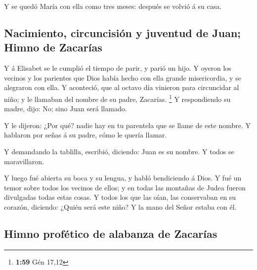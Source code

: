  Y se quedó María con ella como tres meses: después se
volvió á su casa.

\hypertarget{nacimiento-circuncisiuxf3n-y-juventud-de-juan-himno-de-zacaruxedas}{%
\subsection{Nacimiento, circuncisión y juventud de Juan; Himno de
Zacarías}\label{nacimiento-circuncisiuxf3n-y-juventud-de-juan-himno-de-zacaruxedas}}

 Y á Elisabet se le cumplió el tiempo de parir, y parió un
hijo.  Y oyeron los vecinos y los parientes que Dios había
hecho con ella grande misericordia, y se alegraron con ella.
 Y aconteció, que al octavo día vinieron para circuncidar
al niño; y le llamaban del nombre de su padre, Zacarías. \footnote{\textbf{1:59}
  Gén 17,12}  Y respondiendo su madre, dijo: No; sino Juan
será llamado.

 Y le dijeron: ¿Por qué? nadie hay en tu parentela que se
llame de este nombre.  Y hablaron por señas á su padre,
cómo le quería llamar.

 Y demandando la tablilla, escribió, diciendo: Juan es su
nombre. Y todos se maravillaron.

 Y luego fué abierta su boca y su lengua, y habló
bendiciendo á Dios.  Y fué un temor sobre todos los vecinos
de ellos; y en todas las montañas de Judea fueron divulgadas todas estas
cosas.  Y todos los que las oían, las conservaban en su
corazón, diciendo: ¿Quién será este niño? Y la mano del Señor estaba con
él.

\hypertarget{himno-profuxe9tico-de-alabanza-de-zacaruxedas}{%
\subsection{Himno profético de alabanza de
Zacarías}\label{himno-profuxe9tico-de-alabanza-de-zacaruxedas}}

